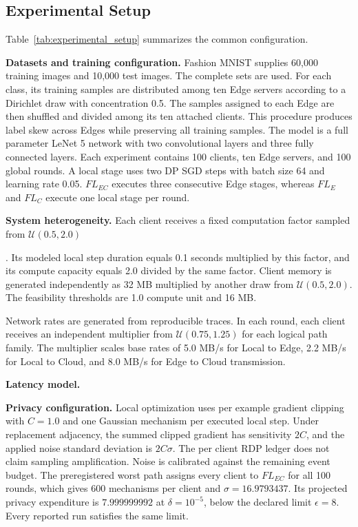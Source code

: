 \documentclass[5p,times]{elsarticle}
\newif\ifshowcomments
\newcommand{\cncomment}[1]{%
  \ifshowcomments
    \textcolor{red}{\textbf{【作者批注：#1】}%
  }\fi
}
\theoremstyle{plain}
\theoremstyle{definition}
\theoremstyle{remark}
\begin{document}
\subsection{Experimental Setup}
\label{sec:exp_setup}

Table~\ref{tab:experimental_setup} summarizes the common configuration.

\textbf{Datasets and training configuration.}
Fashion MNIST supplies 60,000 training images and 10,000 test images.
The complete sets are used.  For each class, its training samples are
distributed among ten Edge servers according to a Dirichlet draw with
concentration 0.5.  The samples assigned to each Edge are then shuffled
and divided among its ten attached clients.  This procedure produces
label skew across Edges while preserving all training samples.
The model is a full parameter LeNet 5 network with two convolutional
layers and three fully connected layers.  Each experiment contains
100 clients, ten Edge servers, and 100 global rounds.  A local stage
uses two DP SGD steps with batch size 64 and learning rate 0.05.
$FL_{EC}$ executes three consecutive Edge stages, whereas $FL_E$ and
$FL_C$ execute one local stage per round.\cncomment{这里理解正确吗，本地epoch为1？}

\textbf{System heterogeneity.}
Each client receives a fixed computation factor sampled from
$\mathcal U(0.5,2.0)$\cncomment{没有解释}.  Its modeled local step duration equals
0.1 seconds multiplied by this factor, and its compute capacity equals
2.0 divided by the same factor.  Client memory is generated
independently as 32 MB multiplied by another draw from
$\mathcal U(0.5,2.0)$.  The feasibility thresholds are 1.0 compute
unit and 16 MB.\cncomment{这里写的太细了，其实我是100
\%接收的，因为这里不是我讨论的重点，所以没有必要写这么详细，我甚至没有讨论资源受限这篇论文}

Network rates are generated from reproducible traces.  In each round,
each client receives an independent multiplier from
$\mathcal U(0.75,1.25)$ for each logical path family.  The multiplier
scales base rates of 5.0 MB/s for Local to Edge, 2.2 MB/s for Local to
Cloud, and 8.0 MB/s for Edge to Cloud transmission.  

\textbf{Latency model.}\cncomment{有什么办法将时延模型一笔带过}

\textbf{Privacy configuration.}
Local optimization uses per example gradient clipping with
$C=1.0$ and one Gaussian mechanism per executed local step.  Under
replacement adjacency, the summed clipped gradient has sensitivity
$2C$, and the applied noise standard deviation is $2C\sigma$.
The per client RDP ledger does not claim sampling amplification.
Noise is calibrated against the remaining event budget.  The
preregistered worst path assigns every client to $FL_{EC}$ for all
100 rounds, which gives 600 mechanisms per client and
$\sigma=16.9793437$.  Its projected privacy expenditure is
$7.999999992$ at $\delta=10^{-5}$, below the declared limit
$\epsilon=8$.  Every reported run satisfies the same limit.\cncomment{这些参数虽然重要，但是如果直接写入配置表可能更好。因为前面已经花篇幅解释这些参数了，这里直接列表，写值，不需要长篇大论}\cncomment{这里最好补上一句通过J来反映包含DP的通信链路带来的影响可以规避正向讨论DP作用的难题，所以我们称之为满足隐私预算需求之下精度-时间的平衡}
\end{document}
